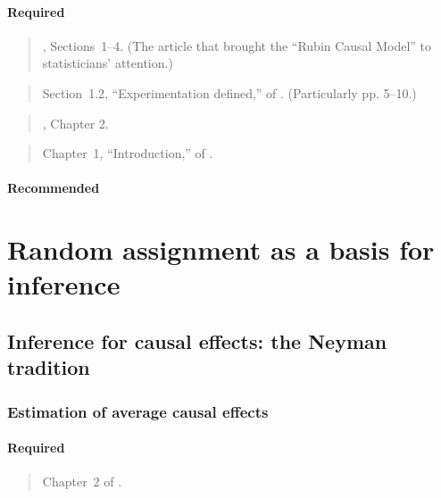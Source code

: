 \documentclass[12pt]{article}
\begin{document}
\paragraph*{Required}

\begin{verse}, Sections~1--4. (The article that brought the ``Rubin Causal Model'' to  statisticians' attention.)\end{verse}

\begin{verse} Section~1.2, ``Experimentation defined,''  of
.  (Particularly pp. 5--10.) \end{verse}

\begin{verse} , Chapter 2. \end{verse}

\begin{verse} Chapter~1, ``Introduction,'' of .\end{verse}

\paragraph*{Recommended}

\begin{verse}  \end{verse}

\section{Random assignment as a basis for inference}

\subsection{Inference for causal effects: the Neyman tradition}

\subsubsection{Estimation of average causal effects} 

\paragraph*{Required}

\begin{verse}
  Chapter~2 of .
\end{verse}
\end{document}
